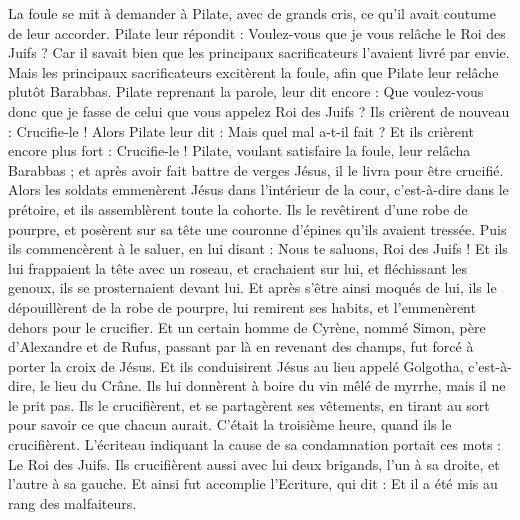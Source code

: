 \begin{multicols}{2}
La foule se mit à demander à Pilate, avec de grands cris, ce qu’il avait coutume de leur accorder.
Pilate leur répondit : Voulez-vous que je vous relâche le Roi des Juifs ?
Car il savait bien que les principaux sacrificateurs l'avaient livré par envie.
Mais les principaux sacrificateurs excitèrent la foule, afin que Pilate leur relâche plutôt Barabbas.
Pilate reprenant la parole, leur dit encore : Que voulez-vous donc que je fasse de celui que vous appelez Roi des Juifs ?
Ils crièrent de nouveau : Crucifie-le !
Alors Pilate leur dit : Mais quel mal a-t-il fait ? Et ils crièrent encore plus fort : Crucifie-le !
Pilate, voulant satisfaire la foule, leur relâcha Barabbas ; et après avoir fait battre de verges Jésus, il le livra pour être crucifié.
Alors les soldats emmenèrent Jésus dans l’intérieur de la cour, c’est-à-dire dans le prétoire, et ils assemblèrent toute la cohorte.
Ils le revêtirent d'une robe de pourpre, et posèrent sur sa tête une couronne d'épines qu’ils avaient tressée.
Puis ils commencèrent à le saluer, en lui disant : Nous te saluons, Roi des Juifs !
Et ils lui frappaient la tête avec un roseau, et crachaient sur lui, et fléchissant les genoux, ils se prosternaient devant lui.
Et après s'être ainsi moqués de lui, ils le dépouillèrent de la robe de pourpre, lui remirent ses habits, et l'emmenèrent dehors pour le crucifier.
Et un certain homme de Cyrène, nommé Simon, père d’Alexandre et de Rufus, passant par là en revenant des champs, fut forcé à porter la croix de Jésus.
Et ils conduisirent Jésus au lieu appelé Golgotha{}, c'est-à-dire, le lieu du Crâne.
Ils lui donnèrent à boire du vin mêlé de myrrhe, mais il ne le prit pas.
Ils le crucifièrent, et se partagèrent ses vêtements, en tirant au sort pour savoir ce que chacun aurait.
C’était la troisième heure, quand ils le crucifièrent.
L’écriteau indiquant la cause de sa condamnation portait ces mots : Le Roi des Juifs.
Ils crucifièrent aussi avec lui deux brigands, l'un à sa droite, et l'autre à sa gauche.
Et ainsi fut accomplie l'Ecriture, qui dit : Et il a été mis au rang des malfaiteurs{}.

\end{multicols}
